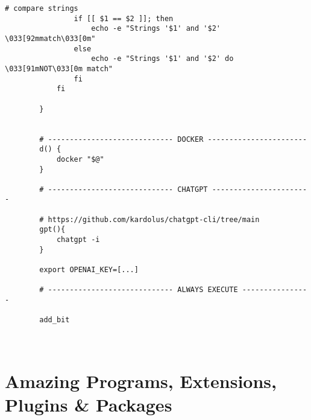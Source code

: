 \documentclass[12pt, a4paper]{article}
\numberwithin{equation}{section}
\theoremstyle{definition}
\theoremstyle{definition}
\begin{document}
\begin{lstlisting}[style=mystylebash, label=alg:bashrc_contents, caption=Contents of .bashrc file, xleftmargin=\parindent]
				# compare strings
				if [[ $1 == $2 ]]; then
					echo -e "Strings '$1' and '$2' \033[92mmatch\033[0m"
				else
					echo -e "Strings '$1' and '$2' do \033[91mNOT\033[0m match"
				fi
			fi
			
		}
		

		# ----------------------------- DOCKER -----------------------
		d() {
			docker "$@"
		}
	
		# ----------------------------- CHATGPT -----------------------

		# https://github.com/kardolus/chatgpt-cli/tree/main
		gpt(){
			chatgpt -i
		}
	
		export OPENAI_KEY=[...]
	
		# ----------------------------- ALWAYS EXECUTE ----------------
		
		add_bit
		
				
	\end{lstlisting}

\newpage 

\section{Amazing Programs, Extensions, Plugins \& Packages}
\end{document}
